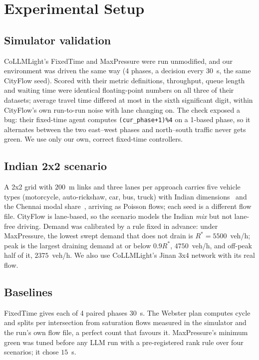 \documentclass[conference]{IEEEtran}
\newcommand{\V}[2]{\ensuremath{#2}}
\begin{document}
\section{Experimental Setup}

\subsection{Simulator validation}\label{sec:validation}
CoLLMLight's FixedTime and MaxPressure were run unmodified, and our environment was driven the
same way (4 phases, a decision every \V{val.matched.interval}{30}~s, the same CityFlow seed).
Scored with their metric definitions, throughput, queue length and waiting time were identical
floating-point numbers on all three of their datasets; average travel time differed at most in
the sixth significant digit, within CityFlow's own run-to-run noise with lane changing on. The
check exposed a bug: their fixed-time agent computes \texttt{(cur\_phase+1)\%4} on a 1-based
phase, so it alternates between the two east--west phases and north--south traffic never gets
green. We use only our own, correct fixed-time controllers.

\subsection{Indian 2x2 scenario}
A 2x2 grid with \V{scn.roadnet.spacing_m}{200}~m links and three lanes per approach carries five vehicle types (motorcycle,
auto-rickshaw, car, bus, truck) with Indian dimensions~\cite{umapathi2019pcu} and the Chennai
modal share~\cite{itrans2009}, arriving as Poisson flows; each seed is a different flow file.
CityFlow is lane-based, so the scenario models the Indian \emph{mix} but not lane-free driving.
Demand was calibrated by a rule fixed in advance: under MaxPressure, the lowest swept demand
that does not drain is $R^*=\V{cal.r_star}{5500}$~veh/h; peak is the largest draining demand
at or below $\V{cal.rule.peak_fraction}{0.9}R^*$, \V{cal.peak}{4750}~veh/h, and off-peak half of
it, \V{cal.offpeak}{2375}~veh/h. We also use CoLLMLight's Jinan 3x4 network with its real flow.

\subsection{Baselines}
FixedTime gives each of 4 paired phases \V{cfg.ft.green}{30}~s. The Webster plan computes cycle
and splits per intersection from saturation flows measured in the simulator and the run's own
flow file, a perfect count that favours it. MaxPressure's minimum green was tuned before any LLM
run with a pre-registered rank rule over four scenarios; it chose \V{mg.chosen}{15}~s.
\end{document}
